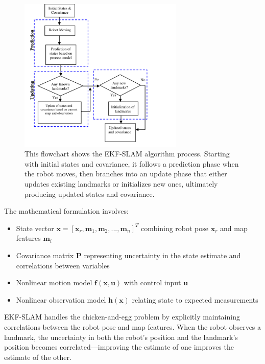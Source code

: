 \documentclass[12pt]{article}
\begin{document}
    \begin{figure}[h!]
        \centering
        \includegraphics[width=0.7\textwidth]{D-EKF-SLAM-operation.png}
        \caption{This flowchart shows the EKF-SLAM algorithm process. Starting with initial states and covariance, it follows a prediction phase when the robot moves, 
        then branches into an update phase that either updates existing landmarks or initializes new ones, ultimately producing updated states and covariance. \cite{ekf_slam_img}}
        \label{fig:D-EKF-SLAM-operation}
    \end{figure}
    
    The mathematical formulation involves:
    \begin{itemize}
        \item State vector $\mathbf{x} = [\mathbf{x}_r, \mathbf{m}_1, \mathbf{m}_2, ..., \mathbf{m}_n]^T$ combining robot pose $\mathbf{x}_r$ and map features $\mathbf{m}_i$
        \item Covariance matrix $\mathbf{P}$ representing uncertainty in the state estimate and correlations between variables
        \item Nonlinear motion model $\mathbf{f}(\mathbf{x}, \mathbf{u})$ with control input $\mathbf{u}$
        \item Nonlinear observation model $\mathbf{h}(\mathbf{x})$ relating state to expected measurements
    \end{itemize}
    
    EKF-SLAM handles the chicken-and-egg problem by explicitly maintaining correlations between the robot pose and map features. When the robot observes a landmark, the uncertainty in both the robot's 
    position and the landmark's position becomes correlated—improving the estimate of one improves the estimate of the other.
    
\end{document}
